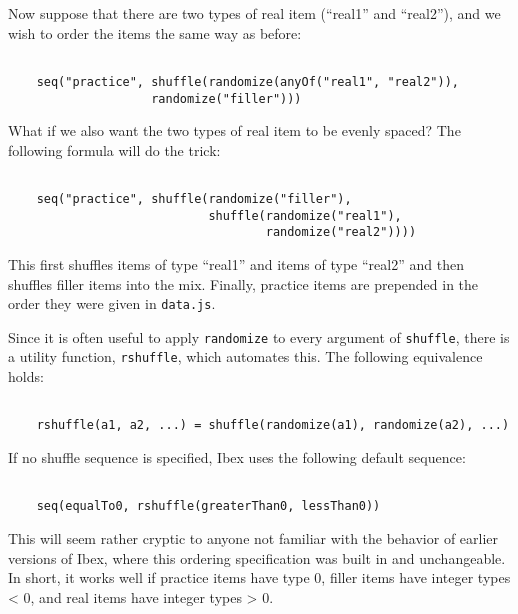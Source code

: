 \documentclass[11pt,letterpaper]{article}
\begin{document}
Now suppose that there are two types of real item (``real1'' and ``real2''), and we
wish to order the items the same way as before:
\footnotesize\begin{verbatim}

    seq("practice", shuffle(randomize(anyOf("real1", "real2")),
                    randomize("filler")))
\end{verbatim}

\smallskip\noindent\normalsize

What if we also want the two types of real item to be evenly spaced?  The
following formula will do the trick:
\footnotesize\begin{verbatim}

    seq("practice", shuffle(randomize("filler"),
                            shuffle(randomize("real1"),
                                    randomize("real2"))))
\end{verbatim}

\smallskip\noindent\normalsize


This first shuffles items of type ``real1'' and items of type ``real2'' and then
shuffles filler items into the mix.  Finally, practice items are prepended in
the order they were given in \texttt{data.js}.

Since it is often useful to apply \texttt{randomize} to every argument of \texttt{shuffle},
there is a utility function, \texttt{rshuffle}, which automates this. The following
equivalence holds:
\footnotesize\begin{verbatim}

    rshuffle(a1, a2, ...) = shuffle(randomize(a1), randomize(a2), ...)
\end{verbatim}

\smallskip\noindent\normalsize

If no shuffle sequence is specified, Ibex uses the following default
sequence:
\footnotesize\begin{verbatim}

    seq(equalTo0, rshuffle(greaterThan0, lessThan0))
\end{verbatim}

\smallskip\noindent\normalsize


This will seem rather cryptic to anyone not familiar with the behavior of
earlier versions of Ibex, where this ordering specification was built in and
unchangeable. In short, it works well if practice items have type 0, filler
items have integer types < 0, and real items have integer types > 0.
\end{document}
